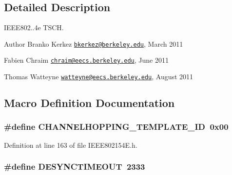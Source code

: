 \subsection{Detailed Description}
I\+E\+E\+E802..\+4e T\+S\+CH. 

\begin{DoxyAuthor}{Author}
Branko Kerkez \href{mailto:bkerkez@berkeley.edu}{\tt bkerkez@berkeley.\+edu}, March 2011 

Fabien Chraim \href{mailto:chraim@eecs.berkeley.edu}{\tt chraim@eecs.\+berkeley.\+edu}, June 2011 

Thomas Watteyne \href{mailto:watteyne@eecs.berkeley.edu}{\tt watteyne@eecs.\+berkeley.\+edu}, August 2011 
\end{DoxyAuthor}


\subsection{Macro Definition Documentation}
\subsubsection[{\texorpdfstring{C\+H\+A\+N\+N\+E\+L\+H\+O\+P\+P\+I\+N\+G\+\_\+\+T\+E\+M\+P\+L\+A\+T\+E\+\_\+\+ID}{CHANNELHOPPING_TEMPLATE_ID}}]{\setlength{\rightskip}{0pt plus 5cm}\#define C\+H\+A\+N\+N\+E\+L\+H\+O\+P\+P\+I\+N\+G\+\_\+\+T\+E\+M\+P\+L\+A\+T\+E\+\_\+\+ID~0x00}\hypertarget{group___i_e_e_e802154_e_gafd325846269d683c9b9bf6d27d21c318}{}\label{group___i_e_e_e802154_e_gafd325846269d683c9b9bf6d27d21c318}


Definition at line 163 of file I\+E\+E\+E802154\+E.\+h.

\subsubsection[{\texorpdfstring{D\+E\+S\+Y\+N\+C\+T\+I\+M\+E\+O\+UT}{DESYNCTIMEOUT}}]{\setlength{\rightskip}{0pt plus 5cm}\#define D\+E\+S\+Y\+N\+C\+T\+I\+M\+E\+O\+UT~2333}\hypertarget{group___i_e_e_e802154_e_ga44bb385ed0db31e2751672455577e2d7}{}\label{group___i_e_e_e802154_e_ga44bb385ed0db31e2751672455577e2d7}


